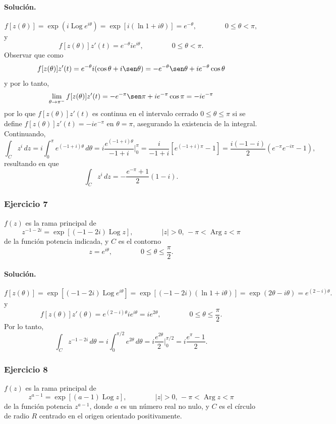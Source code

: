\documentclass[a4paper]{report}
\DeclareMathOperator{\Arg}{Arg}
\DeclareMathOperator{\Log}{Log}
\begin{document}
\paragraph{Solución.} 
\[
 f[z(\theta)]=\exp\left(i\Log e^{i\theta}\right)=\exp\left[i(\ln1+i\theta)\right]=e^{-\theta},
 \qquad\qquad
 0\leq\theta<\pi,
\]
y
\[
 f[z(\theta)]z'(t)=e^{-\theta}ie^{i\theta},
 \qquad\qquad
 0\leq\theta<\pi.
\]
Observar que como
\[
 f[z(\theta)]z'(t)=e^{-\theta}i(\cos\theta+i\sen\theta)=-e^{-\theta}\sen\theta+ie^{-\theta}\cos\theta
\]
y por lo tanto,
\[
 \lim_{\theta\to\pi^-}f[z(\theta)]z'(t)=-e^{-\pi}\sen\pi+ie^{-\pi}\cos\pi=-ie^{-\pi}
\]
por lo que \(f[z(\theta)]z'(t)\) es continua en el intervalo cerrado \(0\leq\theta\leq\pi\) si se define \(f[z(\theta)]z'(t)=-ie^{-\pi}\) en \(\theta=\pi\), asegurando la existencia de la integral. Continuando,
\[
 \int_Cz^i\,dz=i\int_0^\pi e^{(-1+i)\theta}\,d\theta=i\frac{e^{(-1+i)\theta}}{-1+i}\bigg|_0^\pi
  =\frac{i}{-1+i}\left[e^{(-1+i)\pi}-1\right]=\frac{i(-1-i)}{2}\left(e^{-\pi}e^{-i\pi}-1\right),
\]
resultando en que 
\[
 \int_Cz^i\,dz=-\frac{e^{-\pi}+1}{2}(1-i).
\]

\subsubsection{Ejercicio 7}

\(f(z)\) es la rama principal de
\[
 z^{-1-2i}=\exp\left[(-1-2i)\Log z\right],
 \qquad\qquad
 |z|>0,\,-\pi<\Arg z<\pi
\]
de la función potencia indicada, y \(C\) es el contorno
\[
 z=e^{i\theta},
 \qquad\qquad
 0\leq\theta\leq\frac{\pi}{2}.
\]

\paragraph{Solución.} 
\[
 f[z(\theta)]=\exp\left[(-1-2i)\Log e^{i\theta}\right]=\exp\left[(-1-2i)(\ln1+i\theta)\right]=\exp(2\theta-i\theta)=e^{(2-i)\theta}.
\]
y
\[
 f[z(\theta)]z'(\theta)=e^{(2-i)\theta}ie^{i\theta}=ie^{2\theta},
 \qquad\qquad
 0\leq\theta\leq\frac{\pi}{2}.
\]
Por lo tanto,
\[
 \int_Cz^{-1-2i}\,d\theta=i\int_0^{\pi/2}e^{2\theta}\,d\theta=i\frac{e^{2\theta}}{2}\bigg|_0^{\pi/2}=i\frac{e^\pi-1}{2}.
\]

\subsubsection{Ejercicio 8}

\(f(z)\) es la rama principal de
\[
 z^{a-1}=\exp\left[(a-1)\Log z\right],
 \qquad\qquad
 |z|>0,\,-\pi<\Arg z<\pi
\]
de la función potencia \(z^{a-1}\), donde \(a\) es un número real no nulo, y \(C\) es el círculo de radio \(R\) centrado en el origen orientado positivamente.
\end{document}
